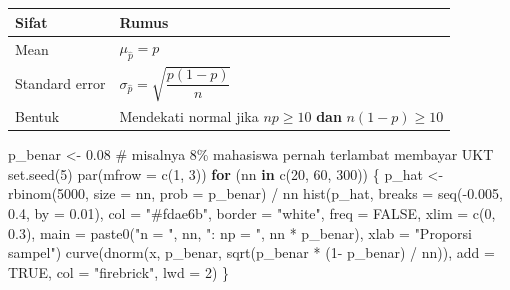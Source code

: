 \documentclass[
  indonesian,
  letterpaper,
]{book}
\newenvironment{Shaded}{\begin{snugshade}}{\end{snugshade}}
\newcommand{\AttributeTok}[1]{\textcolor[rgb]{0.40,0.45,0.13}{#1}}
\newcommand{\CommentTok}[1]{\textcolor[rgb]{0.37,0.37,0.37}{#1}}
\newcommand{\ConstantTok}[1]{\textcolor[rgb]{0.56,0.35,0.01}{#1}}
\newcommand{\ControlFlowTok}[1]{\textcolor[rgb]{0.00,0.23,0.31}{\textbf{#1}}}
\newcommand{\DecValTok}[1]{\textcolor[rgb]{0.68,0.00,0.00}{#1}}
\newcommand{\FloatTok}[1]{\textcolor[rgb]{0.68,0.00,0.00}{#1}}
\newcommand{\FunctionTok}[1]{\textcolor[rgb]{0.28,0.35,0.67}{#1}}
\newcommand{\NormalTok}[1]{\textcolor[rgb]{0.00,0.23,0.31}{#1}}
\newcommand{\OtherTok}[1]{\textcolor[rgb]{0.00,0.23,0.31}{#1}}
\newcommand{\SpecialCharTok}[1]{\textcolor[rgb]{0.37,0.37,0.37}{#1}}
\newcommand{\StringTok}[1]{\textcolor[rgb]{0.13,0.47,0.30}{#1}}
\newcounter{none} %
\begin{document}
{\def\LTcaptype{none} %
\begin{longtable}[]{@{}
  >{\raggedright\arraybackslash}p{}
  >{\raggedright\arraybackslash}p{}@{}}
\toprule\noalign{}
\begin{minipage}[b]{\linewidth}\raggedright
Sifat
\end{minipage} & \begin{minipage}[b]{\linewidth}\raggedright
Rumus
\end{minipage} \\
\midrule\noalign{}
\endhead
\bottomrule\noalign{}
\endlastfoot
Mean & \(\mu_{\hat{p}} = p\) \\
Standard error & \(\sigma_{\hat{p}} = \sqrt{\dfrac{p(1-p)}{n}}\) \\
Bentuk & Mendekati normal jika \(np \geq 10\) \textbf{dan}
\(n(1-p) \geq 10\) \\
\end{longtable}
}

\begin{Shaded}
\begin{Highlighting}[]
\NormalTok{p\_benar }\OtherTok{\textless{}{-}} \FloatTok{0.08}  \CommentTok{\# misalnya 8\% mahasiswa pernah terlambat membayar UKT}
\FunctionTok{set.seed}\NormalTok{(}\DecValTok{5}\NormalTok{)}
\FunctionTok{par}\NormalTok{(}\AttributeTok{mfrow =} \FunctionTok{c}\NormalTok{(}\DecValTok{1}\NormalTok{, }\DecValTok{3}\NormalTok{))}
\ControlFlowTok{for}\NormalTok{ (nn }\ControlFlowTok{in} \FunctionTok{c}\NormalTok{(}\DecValTok{20}\NormalTok{, }\DecValTok{60}\NormalTok{, }\DecValTok{300}\NormalTok{)) \{}
\NormalTok{p\_hat }\OtherTok{\textless{}{-}} \FunctionTok{rbinom}\NormalTok{(}\DecValTok{5000}\NormalTok{, }\AttributeTok{size =}\NormalTok{ nn, }\AttributeTok{prob =}\NormalTok{ p\_benar) }\SpecialCharTok{/}\NormalTok{ nn}
\FunctionTok{hist}\NormalTok{(p\_hat, }\AttributeTok{breaks =} \FunctionTok{seq}\NormalTok{(}\SpecialCharTok{{-}}\FloatTok{0.005}\NormalTok{, }\FloatTok{0.4}\NormalTok{, }\AttributeTok{by =} \FloatTok{0.01}\NormalTok{), }\AttributeTok{col =} \StringTok{"\#fdae6b"}\NormalTok{, }\AttributeTok{border =}
\StringTok{"white"}\NormalTok{,}
\AttributeTok{freq =} \ConstantTok{FALSE}\NormalTok{, }\AttributeTok{xlim =} \FunctionTok{c}\NormalTok{(}\DecValTok{0}\NormalTok{, }\FloatTok{0.3}\NormalTok{),}
\AttributeTok{main =} \FunctionTok{paste0}\NormalTok{(}\StringTok{"n = "}\NormalTok{, nn, }\StringTok{": np = "}\NormalTok{, nn }\SpecialCharTok{*}\NormalTok{ p\_benar), }\AttributeTok{xlab =} \StringTok{"Proporsi sampel"}\NormalTok{)}
\FunctionTok{curve}\NormalTok{(}\FunctionTok{dnorm}\NormalTok{(x, p\_benar, }\FunctionTok{sqrt}\NormalTok{(p\_benar }\SpecialCharTok{*}\NormalTok{ (}\DecValTok{1}\SpecialCharTok{{-}}\NormalTok{ p\_benar) }\SpecialCharTok{/}\NormalTok{ nn)), }\AttributeTok{add =} \ConstantTok{TRUE}\NormalTok{,}
\AttributeTok{col =} \StringTok{"firebrick"}\NormalTok{, }\AttributeTok{lwd =} \DecValTok{2}\NormalTok{)}
\NormalTok{\}}
\end{Highlighting}
\end{Shaded}
\end{document}
